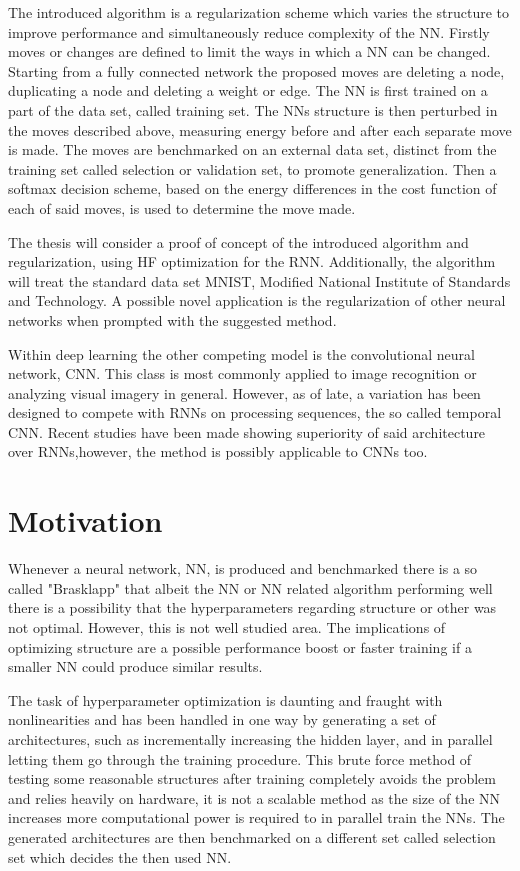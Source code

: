 The introduced algorithm is a regularization scheme which varies the structure to improve performance and simultaneously reduce complexity of the NN. Firstly moves or changes are defined to limit the ways in which a NN can be changed. Starting from a fully connected network the proposed moves are deleting a node, duplicating a node and deleting a weight or edge. The NN is first trained on a part of the data set, called training set. The NNs structure is then perturbed in the moves described above, measuring energy before and after each separate move is made. The moves are benchmarked on an external data set, distinct from the training set called selection or validation set, to promote generalization. Then a softmax decision scheme, based on the energy differences in the cost function of each of said moves, is used to determine the move made. 

The thesis will consider a proof of concept of the introduced algorithm and regularization, using HF optimization for the RNN. Additionally, the algorithm will treat the standard data set MNIST, Modified National Institute of Standards and Technology\cite{mnist}. A possible novel application is the regularization of other neural networks when prompted with the suggested method.

Within deep learning the other competing model is the convolutional neural network, CNN. This class is most commonly applied to image recognition or analyzing visual imagery in general. However, as of late, a variation has been designed to compete with RNNs on processing sequences, the so called temporal CNN. Recent studies have been made showing superiority of said architecture over RNNs\cite{tcnvsrnn},however, the method is possibly applicable to CNNs too.

\section{Motivation}

Whenever a neural network, NN, is produced and benchmarked there is a so called "Brasklapp" that albeit the NN or NN related algorithm performing well there is a possibility that the hyperparameters regarding structure or other was not optimal. However, this is not well studied area. The implications of optimizing structure are a possible performance boost or faster training if a smaller NN could produce similar results. 

The task of hyperparameter optimization is daunting and fraught with nonlinearities and has been handled in one way by generating a set of architectures, such as incrementally increasing the hidden layer, and in parallel letting them go through the training procedure. This brute force method of testing some reasonable structures after training completely avoids the problem and relies heavily on hardware, it is not a scalable method as the size of the NN increases more computational power is required to in parallel train the NNs. The generated architectures are then benchmarked on a different set called selection set which decides the then used NN. 

